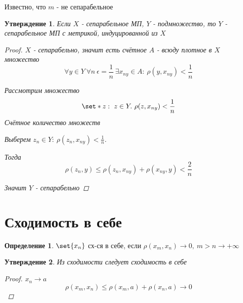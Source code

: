 \documentclass[a4paper]{article}
\DeclarePairedDelimiter\set\{\}
\newtheorem*{statement}{Утверждение}
\theoremstyle{definition}
\newtheorem*{definition}{Определение}
\theoremstyle{remark}
\begin{document}
Известно, что $ m $ - не сепарабельное

\begin{tcolorbox}
    \begin{statement}
        Если $ X $ - сепарабельное МП, $ Y $ - подмножество, то $ Y $ - сепарабельное
        МП с метрикой, индуцированной из $ X $ 

        \begin{proof}
            $ X $ - сепарабельно, значит есть счётное $ A $ - всюду плотное в $ X $
            множество
            \[
                \forall y \in Y \ \forall n \ \epsilon = \frac{1}{n} \ \exists
                x_{ny} \in A: \ \rho(y, x_{ny}) < \frac{1}{n} 
            \]

            Рассмотрим множество
            \[
                \set*{z: \ z \in Y. \ \rho(z, x_{ny}) < \frac{1}{n}} 
            \]
            Счётное количество множеств

            Выберем $ z_n \in Y: \ \rho(z_n, x_{ny}) < \frac{1}{n} $.

            Тогда
            \[
                \rho(z_n,y) \leq \rho(z_n, x_{ny}) + \rho(x_{ny}, y) < \frac{2}{n}    
            \]

            Значит $ Y $ - сепарабельно
        \end{proof}
    \end{statement}
\end{tcolorbox}

\section*{\centering Сходимость в себе}
\begin{tcolorbox}
    \begin{definition}
        $ \set{x_n} $ сх-ся в себе, если $ \rho(x_m, x_n) \to 0, \ m > n \to +\infty $ 
    \end{definition}
\end{tcolorbox}

\begin{tcolorbox}
\begin{statement}
    Из сходимости следует сходимость в себе
    \begin{proof}
        $ x_n \to a $ 
        \[
            \rho(x_m, x_n) \leq \rho(x_m, a) + \rho(x_n, a) \to 0
        \]
    \end{proof}
\end{statement}
\end{tcolorbox}
\end{document}
